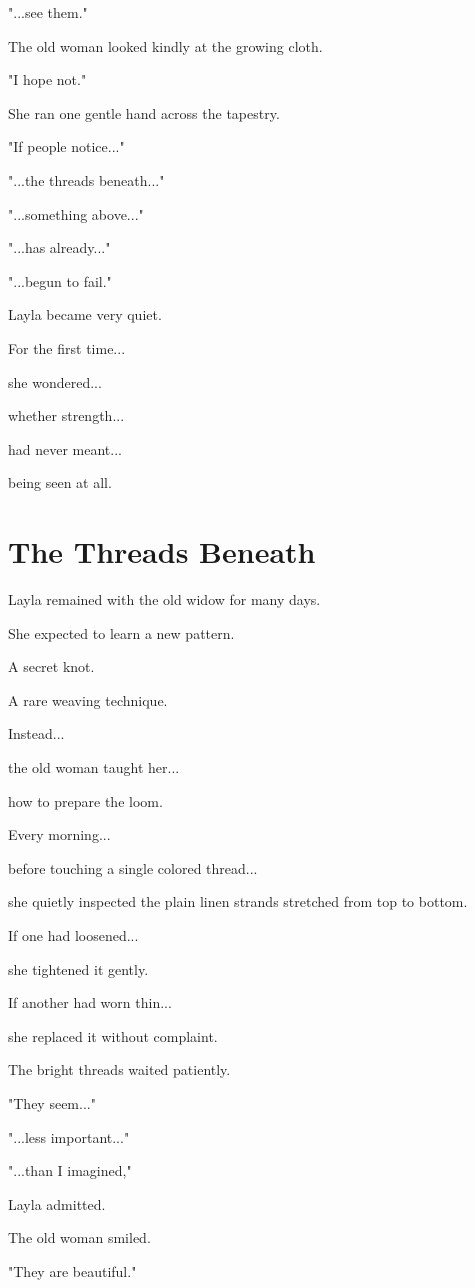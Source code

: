 \documentclass[12pt,openany]{book}
\begin{document}
"...see them."

The old woman looked kindly at the growing cloth.

"I hope not."

She ran one gentle hand across the tapestry.

"If people notice..."

"...the threads beneath..."

"...something above..."

"...has already..."

"...begun to fail."

Layla became very quiet.

For the first time...

she wondered...

whether strength...

had never meant...

being seen at all.
\section*{The Threads Beneath}

Layla remained with the old widow for many days.

She expected to learn a new pattern.

A secret knot.

A rare weaving technique.

Instead...

the old woman taught her...

how to prepare the loom.

Every morning...

before touching a single colored thread...

she quietly inspected the plain linen strands stretched from top to bottom.

If one had loosened...

she tightened it gently.

If another had worn thin...

she replaced it without complaint.

The bright threads waited patiently.

"They seem..."

"...less important..."

"...than I imagined,"

Layla admitted.

The old woman smiled.

"They are beautiful."
\end{document}

